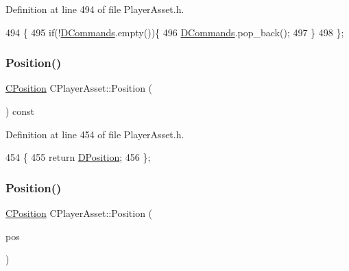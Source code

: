 Definition at line 494 of file Player\+Asset.\+h.


\begin{DoxyCode}
494                          \{
495             \textcolor{keywordflow}{if}(!\hyperlink{classCPlayerAsset_a4d3b96106d3b1c1020f98005884d2a87}{DCommands}.empty())\{
496                 \hyperlink{classCPlayerAsset_a4d3b96106d3b1c1020f98005884d2a87}{DCommands}.pop\_back();
497             \}
498         \};
\end{DoxyCode}
\hypertarget{classCPlayerAsset_aed5b55f9b2f2771ebac193275d378799}{}\label{classCPlayerAsset_aed5b55f9b2f2771ebac193275d378799} 
\subsubsection{\texorpdfstring{Position()}{Position()}\hspace{0.1cm}{\footnotesize\ttfamily [1/2]}}
{\footnotesize\ttfamily \hyperlink{classCPosition}{C\+Position} C\+Player\+Asset\+::\+Position (\begin{DoxyParamCaption}{ }\end{DoxyParamCaption}) const\hspace{0.3cm}{\ttfamily [inline]}}



Definition at line 454 of file Player\+Asset.\+h.


\begin{DoxyCode}
454                                   \{
455             \textcolor{keywordflow}{return} \hyperlink{classCPlayerAsset_aa9f53c009b181c7c5647c6b03776a04c}{DPosition};  
456         \};
\end{DoxyCode}
\hypertarget{classCPlayerAsset_a8c3ed4ab81f79aa28faec6bf790a0a79}{}\label{classCPlayerAsset_a8c3ed4ab81f79aa28faec6bf790a0a79} 
\subsubsection{\texorpdfstring{Position()}{Position()}\hspace{0.1cm}{\footnotesize\ttfamily [2/2]}}
{\footnotesize\ttfamily \hyperlink{classCPosition}{C\+Position} C\+Player\+Asset\+::\+Position (\begin{DoxyParamCaption}\item[{const \hyperlink{classCPosition}{C\+Position} \&}]{pos }\end{DoxyParamCaption})}



